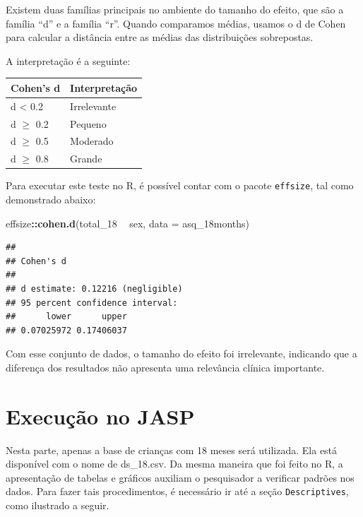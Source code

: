 \documentclass[
]{book}
\newenvironment{Shaded}{\begin{snugshade}}{\end{snugshade}}
\newcommand{\DataTypeTok}[1]{\textcolor[rgb]{0.13,0.29,0.53}{#1}}
\newcommand{\DecValTok}[1]{\textcolor[rgb]{0.00,0.00,0.81}{#1}}
\newcommand{\KeywordTok}[1]{\textcolor[rgb]{0.13,0.29,0.53}{\textbf{#1}}}
\newcommand{\NormalTok}[1]{#1}
\newcommand{\OperatorTok}[1]{\textcolor[rgb]{0.81,0.36,0.00}{\textbf{#1}}}
\newcommand{\StringTok}[1]{\textcolor[rgb]{0.31,0.60,0.02}{#1}}
\begin{document}
Existem duas famílias principais no ambiente do tamanho do efeito, que
são a família ``d'' e a família ``r''. Quando comparamos médias, usamos
o d de Cohen para calcular a distância entre as médias das distribuições
sobrepostas.

A interpretação é a seguinte:

\begin{longtable}[]{@{}ll@{}}
\toprule
Cohen's d & Interpretação\tabularnewline
\midrule
\endhead
d \textless{} 0.2 & Irrelevante\tabularnewline
d \(\geq\) 0.2 & Pequeno\tabularnewline
d \(\geq\) 0.5 & Moderado\tabularnewline
d \(\geq\) 0.8 & Grande\tabularnewline
\bottomrule
\end{longtable}

Para executar este teste no R, é possível contar com o pacote
\texttt{effsize}, tal como demonstrado abaixo:

\begin{Shaded}
\begin{Highlighting}[]
\NormalTok{effsize}\OperatorTok{::}\KeywordTok{cohen.d}\NormalTok{(total_}\DecValTok{18} \OperatorTok{~}\StringTok{ }\NormalTok{sex, }\DataTypeTok{data =}\NormalTok{ asq_18months)}
\end{Highlighting}
\end{Shaded}

\begin{verbatim}
## 
## Cohen's d
## 
## d estimate: 0.12216 (negligible)
## 95 percent confidence interval:
##      lower      upper 
## 0.07025972 0.17406037
\end{verbatim}

Com esse conjunto de dados, o tamanho do efeito foi irrelevante,
indicando que a diferença dos resultados não apresenta uma relevância
clínica importante.

\hypertarget{execuuxe7uxe3o-no-jasp-2}{%
\section{Execução no JASP}\label{execuuxe7uxe3o-no-jasp-2}}

Nesta parte, apenas a base de crianças com 18 meses será utilizada. Ela
está disponível com o nome de ds\_18.csv. Da mesma maneira que foi feito
no R, a apresentação de tabelas e gráficos auxiliam o pesquisador a
verificar padrões nos dados. Para fazer tais procedimentos, é necessário
ir até a seção \texttt{Descriptives}, como ilustrado a seguir.
\end{document}

